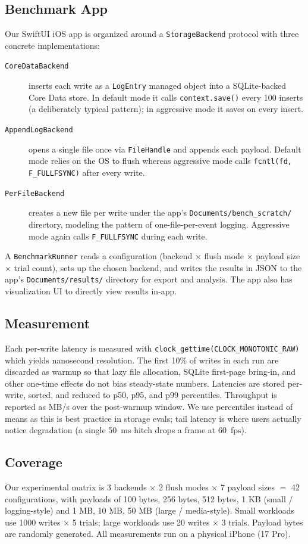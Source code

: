 \subsection{Benchmark App}
Our SwiftUI iOS app is organized
around a \texttt{StorageBackend} protocol with three concrete
implementations:
\begin{description}
\item[\texttt{CoreDataBackend}] inserts each write as a \texttt{LogEntry}
  managed object into a SQLite-backed Core Data store. In default mode it
  calls \texttt{context.save()} every 100 inserts (a deliberately typical
  pattern); in aggressive mode it saves on every insert.
\item[\texttt{AppendLogBackend}] opens a single file once via
  \texttt{FileHandle} and appends each payload. Default mode relies on the OS to flush whereas aggressive mode calls \verb|fcntl(fd, F_FULLFSYNC)| after every write.
\item[\texttt{PerFileBackend}] creates a new file per write under the
  app's \texttt{Documents/bench\_scratch/} directory, modeling the
  pattern of one-file-per-event logging. Aggressive mode again calls \verb|F_FULLFSYNC| during each write.
\end{description}
A \texttt{BenchmarkRunner} reads a configuration (backend $\times$ flush
mode $\times$ payload size $\times$ trial count), sets up the chosen
backend, and writes the results in JSON to the app's
\texttt{Documents/results/} directory for export and analysis. The app also has visualization UI to directly view results in-app.

\subsection{Measurement}
Each per-write latency is measured with
\verb|clock_gettime(CLOCK_MONOTONIC_RAW)| which yields nanosecond resolution. The first 10\% of writes in each run are
discarded as warmup so that lazy file allocation, SQLite first-page
bring-in, and other one-time effects do not bias steady-state numbers.
Latencies are stored per-write, sorted, and reduced to p50, p95, and p99
percentiles. Throughput is reported as MB/s over the post-warmup window.
We use percentiles instead of means as this is best practice in storage evals; tail latency is where users actually notice degradation (a single 50~ms hitch drops a frame at 60~fps).

\subsection{Coverage}
Our experimental matrix is 3 backends $\times$ 2 flush modes $\times$ 7
payload sizes $=$ 42 configurations, with payloads of 100 bytes, 256 bytes, 512  bytes, 1 KB (small / logging-style) and 1 MB, 10 MB, 50 MB (large / media-style). Small workloads use 1000 writes $\times$ 5 trials; large workloads use 20 writes $\times$ 3 trials. Payload bytes are randomly generated. All measurements run on a physical iPhone (17 Pro).
